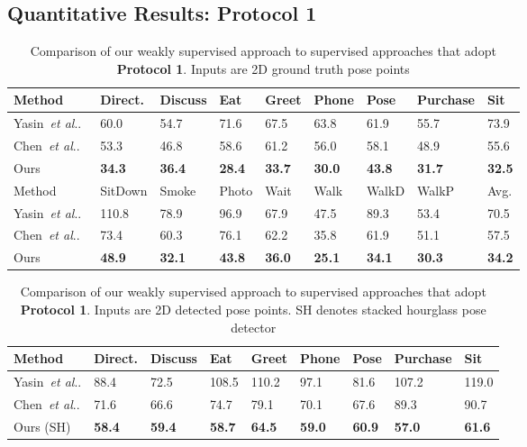 \documentclass[runningheads]{llncs}
\makeatletter
\DeclareRobustCommand\onedot{\futurelet\@let@token\@onedot}
\def\@onedot{\ifx\@let@token.\else.\null\fi\xspace}
\def\etal{\emph{et al}\onedot}
\makeatother
\begin{document}
\subsection{Quantitative Results: Protocol 1}\label{sect:quantitative}\begin{table*}[htb!]
\caption{Comparison of our weakly supervised approach to supervised approaches that adopt \textbf{Protocol 1}. Inputs are 2D ground truth pose points}
\label{table:protocol1_gt}
	\centering
	\begin{tabularx}{\textwidth}{ l *{8}{Y} }
			
		\toprule
		Method & Direct. & Discuss & Eat & Greet & Phone & Pose & Purchase & Sit\\
		\midrule
		Yasin~\etal~\cite{Yasin_2016_CVPR} & 60.0 & 54.7 & 71.6 & 67.5 & 63.8 & 61.9 & 55.7 & 73.9  \\
		Chen~\etal~\cite{ChenDeva2017}  &{53.3} &{46.8} &{58.6} &{61.2} &{56.0} &{58.1} &{48.9} &{55.6}\\
		Ours  &\textbf{34.3} &\textbf{36.4} &\textbf{28.4} &\textbf{33.7} &\textbf{30.0} &\textbf{43.8} &\textbf{31.7} &\textbf{32.5}\\
		\bottomrule
		\toprule
		Method  & SitDown & Smoke & Photo & Wait & Walk & WalkD & WalkP & Avg.\\
		\midrule
		Yasin~\etal~\cite{Yasin_2016_CVPR} & 110.8 & 78.9 & 96.9 & 67.9 & 47.5 & 89.3 & 53.4 & 70.5  \\
		Chen~\etal~\cite{ChenDeva2017} & {73.4} & {60.3} &{76.1} &{62.2} &{35.8} &{61.9} &{51.1} & {57.5} \\		
		Ours &\textbf{48.9}&\textbf{32.1} &\textbf{43.8} &\textbf{36.0} &\textbf{25.1} &\textbf{34.1} &\textbf{30.3} & \textbf{34.2} \\
		\bottomrule
	\end{tabularx}
\end{table*}\begin{table*}[t]
	\centering
\caption{Comparison of our weakly supervised approach to supervised approaches that adopt \textbf{Protocol 1}. Inputs are 2D detected pose points. SH denotes stacked hourglass pose detector}
\label{table:protocol1_sh}
	\begin{tabularx}{\textwidth}{ l *{8}{Y} }
		\toprule
		Method & Direct. & Discuss & Eat & Greet & Phone & Pose & Purchase & Sit\\
		\midrule
		Yasin~\etal \cite{Yasin_2016_CVPR}& 88.4 & 72.5 & 108.5 & 110.2 & 97.1 & 81.6 & 107.2 & 119.0 \\
		Chen~\etal \cite{ChenDeva2017} &71.6 &66.6 &74.7 &79.1 &{70.1} &{67.6} &{89.3} &{90.7} \\
		Ours (SH) & \textbf{58.4}& 	\textbf{59.4}& 	\textbf{58.7}& 	\textbf{64.5}& 	\textbf{59.0} &	\textbf{60.9} &	\textbf{57.0} & \textbf{61.6}	\\


\end{tabularx}
\end{table*}
\end{document}
